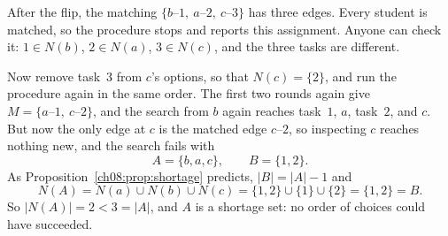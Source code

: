 \begin{center}
\end{center}

After the flip, the matching $\{b\text{--}1,\ a\text{--}2,\ c\text{--}3\}$ has three edges. Every student is matched, so the procedure stops and reports this assignment. Anyone can check it: $1\in N(b)$, $2\in N(a)$, $3\in N(c)$, and the three tasks are different.

Now remove task~$3$ from $c$'s options, so that $N(c)=\{2\}$, and run the procedure again in the same order. The first two rounds again give $M=\{a\text{--}1,\ c\text{--}2\}$, and the search from $b$ again reaches task~$1$, $a$, task~$2$, and $c$. But now the only edge at $c$ is the matched edge $c$--$2$, so inspecting $c$ reaches nothing new, and the search fails with
\[
A=\{b,a,c\},\qquad B=\{1,2\}.
\]
As Proposition~\ref{ch08:prop:shortage} predicts, $|B|=|A|-1$ and
\[
N(A)=N(a)\cup N(b)\cup N(c)=\{1,2\}\cup\{1\}\cup\{2\}=\{1,2\}=B.
\]
So $|N(A)|=2<3=|A|$, and $A$ is a shortage set: no order of choices could have succeeded.
